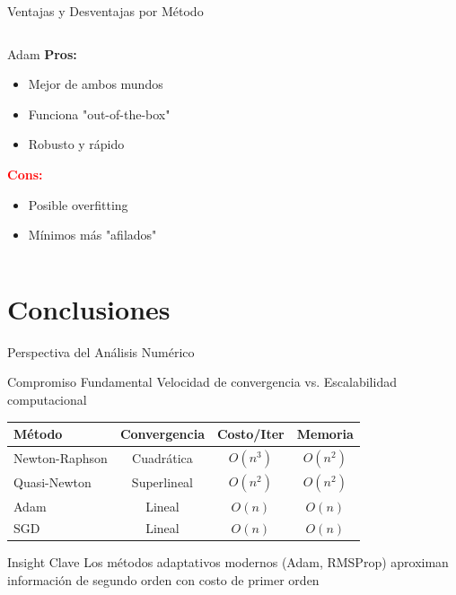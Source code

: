 \documentclass[10pt]{beamer}
\begin{document}
\begin{frame}{Ventajas y Desventajas por Método}
\begin{columns}
\begin{column}{0.5\textwidth}
\begin{block}{Adam}
\textcolor{verdeClaro}{\textbf{Pros:}}
\begin{itemize}
\item Mejor de ambos mundos
\item Funciona "out-of-the-box"
\item Robusto y rápido
\end{itemize}
\textcolor{red}{\textbf{Cons:}}
\begin{itemize}
\item Posible overfitting
\item Mínimos más "afilados"
\end{itemize}
\end{block}
\end{column}
\end{columns}
\end{frame}

\section{Conclusiones}

\begin{frame}{Perspectiva del Análisis Numérico}
\begin{block}{Compromiso Fundamental}
Velocidad de convergencia vs. Escalabilidad computacional
\end{block}

\begin{table}[ht]
\centering
\small
\begin{tabular}{lccc}
\toprule
\textbf{Método} & \textbf{Convergencia} & \textbf{Costo/Iter} & \textbf{Memoria} \\
\midrule
Newton-Raphson & Cuadrática & $O(n^3)$ & $O(n^2)$ \\
Quasi-Newton & Superlineal & $O(n^2)$ & $O(n^2)$ \\
Adam & Lineal & $O(n)$ & $O(n)$ \\
SGD & Lineal & $O(n)$ & $O(n)$ \\
\bottomrule
\end{tabular}
\end{table}

\begin{alertblock}{Insight Clave}
Los métodos adaptativos modernos (Adam, RMSProp) aproximan información de segundo orden con costo de primer orden
\end{alertblock}
\end{frame}
\end{document}
